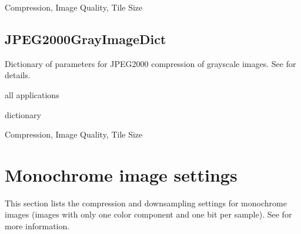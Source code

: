 \documentclass[letterpaper,12pt,english,openany,oneside]{sphinxmanual}
\begin{document}
Compression, Image Quality, Tile Size

\label{\detokenize{PDF_Create_CommonSettings:default-value-48}}

\begin{sphinxVerbatim}[commandchars=\\\{\}]
     
\end{sphinxVerbatim}




\subsection{JPEG2000GrayImageDict}
\label{\detokenize{PDF_Create_CommonSettings:jpeg2000grayimagedict}}
Dictionary of parameters for JPEG2000 compression of grayscale images. See  for details.

\label{\detokenize{PDF_Create_CommonSettings:supported-by-53}}

all applications

\label{\detokenize{PDF_Create_CommonSettings:type-53}}

dictionary

\label{\detokenize{PDF_Create_CommonSettings:ui-name-40}}

Compression, Image Quality, Tile Size

\label{\detokenize{PDF_Create_CommonSettings:default-value-49}}

\begin{sphinxVerbatim}[commandchars=\\\{\}]
      
\end{sphinxVerbatim}




\section{Monochrome image settings}
\label{\detokenize{PDF_Create_CommonSettings:monochrome-image-settings}}
This section lists the compression and downsampling settings for monochrome images (images with only one color component and one bit per sample). See  for more information.
\end{document}
